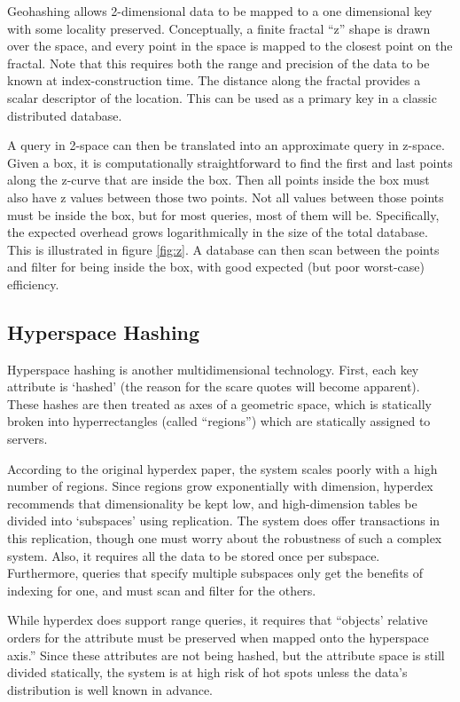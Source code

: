 \documentclass[11pt]{article}
\begin{document}
Geohashing allows 2-dimensional data to be mapped to a one dimensional key with some locality preserved.  Conceptually, a finite fractal ``z'' shape is drawn over the space, and every point in the space is mapped to the closest point on the fractal.  Note that this requires both the range and precision of the data to be known at index-construction time.  The distance along the fractal provides a scalar descriptor of the location.  This can be used as a primary key in a classic distributed database.\cite{gh}

A query in 2-space can then be translated into an approximate query in z-space.  Given a box, it is computationally straightforward to find the first and last points along the z-curve that are inside the box.  Then all points inside the box must also have z values between those two points.  Not all values between those points must be inside the box, but for most queries, most of them will be.  Specifically, the expected overhead grows logarithmically in the size of the total database\cite{ghs}.  This is illustrated in figure \ref{fig:z}. A database can then scan between the points and filter for being inside the box, with good expected (but poor worst-case) efficiency.

\subsection{Hyperspace Hashing}

Hyperspace hashing is another multidimensional technology. First, each key attribute is `hashed' (the reason for the scare quotes will become apparent). These hashes are then treated as axes of a geometric space, which is statically broken into hyperrectangles (called ``regions'') which are statically assigned to servers.\cite{hh}

According to the original hyperdex paper, the system scales poorly with a high number of regions. Since regions grow exponentially with dimension, hyperdex recommends that dimen\-sionality be kept low, and high-dimension tables be divided into `subspaces' using replication. The system does offer transactions in this replication, though one must worry about the robustness of such a complex system. Also, it requires all the data to be stored once per subspace. Furthermore, queries that specify multiple subspaces only get the benefits of indexing for one, and must scan and filter for the others.

While hyperdex does support range queries, it requires that ``objects' relative orders for the attribute must be preserved when mapped onto the hyperspace axis.'' Since these attributes are not being hashed, but the attribute space is still divided statically, the system is at high risk of hot spots unless the data's distribution is well known in advance.
\end{document}
